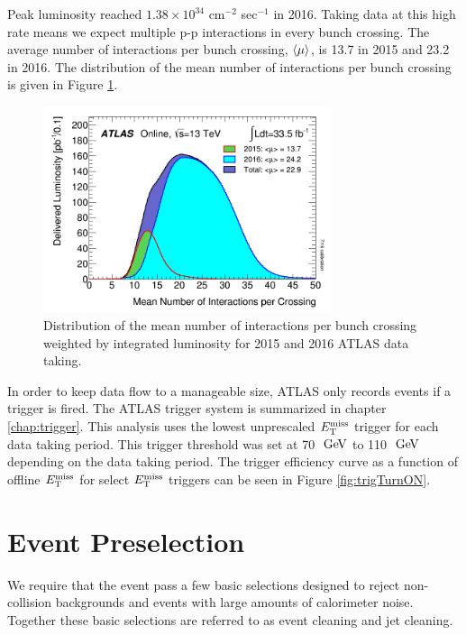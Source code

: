 \indent Peak luminosity reached $1.38 \times 10^{34}$  cm$^{-2}$ sec$^{-1}$ in 2016.  Taking data at this high rate means we expect multiple p-p interactions in every bunch crossing.  The average number of interactions per bunch crossing, $\braket{\mu}$, is 13.7 in 2015 and 23.2 in 2016.  The distribution of the mean number of interactions per bunch crossing is given in Figure \ref{fig:nVtx}.   \\

\begin{figure}[h!]
  \begin{center}
    \includegraphics[width=0.75\textwidth]{figures/Data/mu_2015_2016_LHCC.png}
\end{center}
\caption{Distribution of the mean number of interactions per bunch crossing weighted by integrated luminosity for 2015 and 2016 ATLAS data taking.    }
\label{fig:nVtx} 
\end{figure}

\indent In order to keep data flow to a manageable size, ATLAS only records events if a trigger is fired.  The ATLAS trigger system is summarized in chapter \ref{chap:trigger}.  This analysis uses the lowest unprescaled $E_{\mathrm{T}}^{\mathrm{miss}}$ trigger for each data taking period.  This trigger threshold was set at 70 $\gev$ to 110 $\gev$ depending on the data taking period. The trigger efficiency curve as a function of offline $E_{\mathrm{T}}^{\mathrm{miss}}$ for select $E_{\mathrm{T}}^{\mathrm{miss}}$ triggers can be seen in Figure \ref{fig:trigTurnON}. \\

\chapter{Event Preselection}
\label{chap:Selection_EventPreselection}

\indent We require that the event pass a few basic selections designed to reject non-collision backgrounds and events with large amounts of calorimeter noise.  Together these basic selections are referred to as event cleaning and jet cleaning.  \\ %

